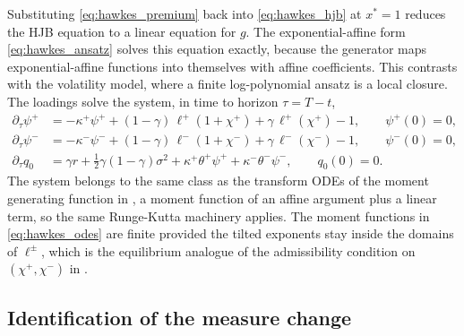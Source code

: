 \documentclass[11pt]{article}
\theoremstyle{remark}
\begin{document}
Substituting \eqref{eq:hawkes_premium} back into \eqref{eq:hawkes_hjb} at $x^{*}=1$ reduces the HJB equation to a linear equation for $g$. The exponential-affine form \eqref{eq:hawkes_ansatz} solves this equation exactly, because the generator maps exponential-affine functions into themselves with affine coefficients. This contrasts with the volatility model, where a finite log-polynomial ansatz is a local closure. The loadings solve the system, in time to horizon $\tau = T-t$,
\begin{equation}\label{eq:hawkes_odes}
\begin{split}
\partial_{\tau}\psi^{+} &= -\kappa^{+}\psi^{+} + (1-\gamma)\,\ell^{+}(1+\chi^{+}) + \gamma\, \ell^{+}(\chi^{+}) - 1, \qquad \psi^{+}(0)=0,\\
\partial_{\tau}\psi^{-} &= -\kappa^{-}\psi^{-} + (1-\gamma)\,\ell^{-}(1+\chi^{-}) + \gamma\, \ell^{-}(\chi^{-}) - 1, \qquad \psi^{-}(0)=0,\\
\partial_{\tau}q_{0} &= \gamma r + \frac{1}{2}\gamma(1-\gamma)\sigma^{2} + \kappa^{+}\theta^{+}\psi^{+} + \kappa^{-}\theta^{-}\psi^{-}, \qquad q_{0}(0)=0.
\end{split}
\end{equation}
The system belongs to the same class as the transform ODEs of the moment generating function in \cite{LiuPackhamSepp2026}, a moment function of an affine argument plus a linear term, so the same Runge-Kutta machinery applies. The moment functions in \eqref{eq:hawkes_odes} are finite provided the tilted exponents stay inside the domains of $\ell^{\pm}$, which is the equilibrium analogue of the admissibility condition on $(\chi^{+},\chi^{-})$ in \cite{LiuPackhamSepp2026}.

\subsection{Identification of the measure change}
\end{document}
